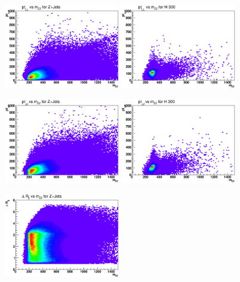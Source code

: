 \begin{figure}[htb!]
\centerline{
\includegraphics[width=0.45\textwidth]{Optimization/mzz_ptLL_background.eps}
\includegraphics[width=0.45\textwidth]{Optimization/mzz_ptLL_300.eps}
}
\centerline{
\includegraphics[width=0.45\textwidth]{Optimization/mzz_ptJJ_background.eps}
\includegraphics[width=0.45\textwidth]{Optimization/mzz_ptJJ_300.eps} \\
}
\centerline{
\includegraphics[width=0.45\textwidth]{Optimization/mzz_jjdr_background.eps}
}
\end{figure}
